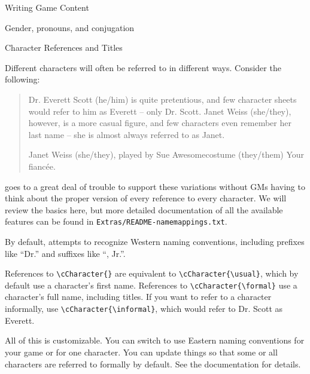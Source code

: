 \documentclass[sheet]{GameTexBase}
\begin{document}
\begin{section}{Writing Game Content}
\begin{subsection}{Gender, pronouns, and conjugation}
\end{subsection}
\begin{subsection}{Character References and Titles}
\label{charintro}
\label{charcontact}

Different characters will often be referred to in different ways.  Consider the following:

\begin{quote}
Dr. Everett Scott (he/him) is quite pretentious, and few character sheets would refer to him as Everett -- only Dr. Scott.  Janet Weiss (she/they), however, is a more casual figure, and few characters even remember her last name -- she is almost always referred to as Janet.

\begin{desc}[Contacts]
\item[Janet Weiss (she/they), played by Sue Awesomecostume (they/them)] Your fianc\'ee.
\end{desc}
\end{quote}

\gametex{} goes to a great deal of trouble to support these variations without GMs having to think about the proper version of every reference to every character.  We will review the basics here, but more detailed documentation of all the available features can be found in \texttt{Extras/README-namemappings.txt}.

By default, \gametex{} attempts to recognize Western naming conventions, including prefixes like ``Dr.'' and suffixes like ``, Jr.''.

References to \lstinline|\cCharacter{}| are equivalent to \lstinline|\cCharacter{\usual}|, which by default use a character's first name.  References to \lstinline|\cCharacter{\formal}| use a character's full name, including titles.  If you want to refer to a character informally, use \lstinline|\cCharacter{\informal}|, which would refer to Dr. Scott as Everett.

All of this is customizable.  You can switch \gametex{} to use Eastern naming conventions for your game or for one character.  You can update things so that some or all characters are referred to formally by default.  See the documentation for details.


\end{subsection}
\end{section}
\end{document}
